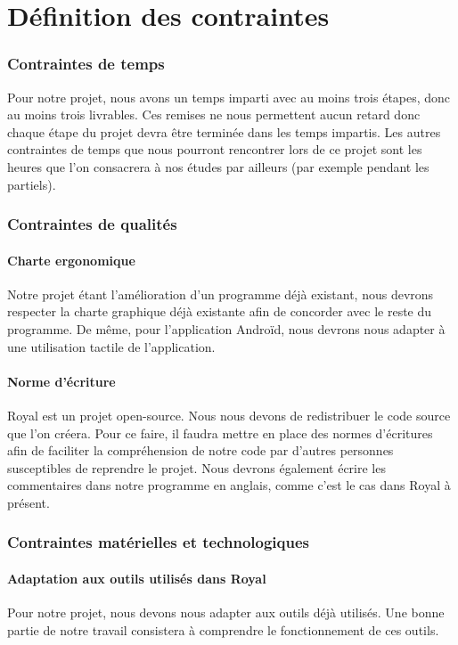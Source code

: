 \part{Définition des contraintes}


\section{Contraintes de temps}
Pour notre projet, nous avons un temps imparti avec au moins trois étapes, donc au moins trois livrables. Ces remises ne nous permettent aucun retard donc chaque étape du projet devra être terminée dans les temps impartis.
Les autres contraintes de temps que nous pourront rencontrer lors de ce projet sont les heures que l'on consacrera à nos études par ailleurs (par exemple pendant les partiels). 

\section{Contraintes de qualités}

\subsection{Charte ergonomique}
Notre projet étant l'amélioration d'un programme déjà existant, nous devrons respecter la charte graphique déjà existante afin de concorder avec le reste du programme. 
De même, pour l'application Androïd, nous devrons nous adapter à une utilisation tactile de l'application. 

\subsection{Norme d'écriture}
Royal est un projet open-source. 
Nous nous devons de redistribuer le code source que l'on créera.
Pour ce faire, il faudra mettre en place des normes d'écritures afin de faciliter la compréhension de notre code par d'autres personnes susceptibles de reprendre le projet. 
Nous devrons également écrire les commentaires dans notre programme en anglais, comme c'est le cas dans Royal à présent.

\section{Contraintes matérielles et technologiques}

\subsection{Adaptation aux outils utilisés dans Royal}
Pour notre projet, nous devons nous adapter aux outils déjà utilisés. Une bonne partie de notre travail consistera à comprendre le fonctionnement de ces outils.

